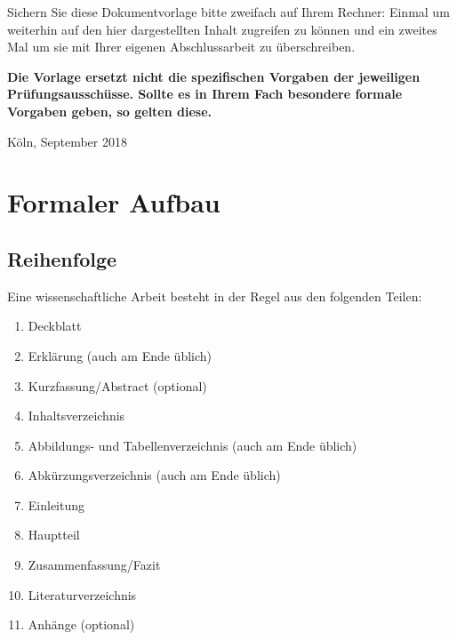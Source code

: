 \documentclass[a4paper,11pt]{article}%
\renewcommand{\\}{\vspace*{0.5\baselineskip} \newline}
\begin{document}
Sichern Sie diese Dokumentvorlage bitte zweifach auf Ihrem Rechner: Einmal um weiterhin auf den hier dargestellten Inhalt zugreifen zu können und ein zweites Mal um sie mit Ihrer eigenen Abschlussarbeit zu überschreiben.\\

\textbf{Die Vorlage ersetzt nicht die spezifischen Vorgaben der jeweiligen Prüfungsausschüsse. Sollte es in Ihrem Fach besondere formale Vorgaben geben, so gelten diese.}\\

Köln, September 2018 

\newpage

\section{Formaler Aufbau}

\subsection{Reihenfolge}

Eine wissenschaftliche Arbeit besteht in der Regel aus den folgenden Teilen:

\begin{enumerate}

	\item Deckblatt

	\item Erklärung (auch am Ende üblich)

	\item Kurzfassung/Abstract (optional)

	\item Inhaltsverzeichnis

	\item Abbildungs- und Tabellenverzeichnis (auch am Ende üblich)

	\item Abkürzungsverzeichnis (auch am Ende üblich)

	\item Einleitung

	\item Hauptteil

	\item Zusammenfassung/Fazit

	\item Literaturverzeichnis

	\item Anhänge (optional)

\end{enumerate}
\end{document}
